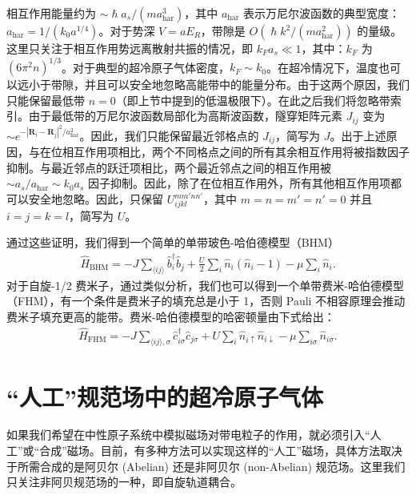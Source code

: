 相互作用能量约为 \(\sim \hslash a_s / (m a_{\text{har}}^3)\)，其中 \(a_{\text{har}}\) 表示万尼尔波函数的典型宽度：\(a_{\text{har}} = 1 / (k_0 a^{1/4})\)。对于势深 \(V = a E_R\)，带隙是 \(O(\hslash k^2 / (m a_{\text{har}}^2))\) 的量级。这里只关注于相互作用势远离散射共振的情况，即 \(k_F a_s \ll 1\)，其中：\(k_F\) 为 \((6\pi^2 n)^{1/3}\)。对于典型的超冷原子气体密度，\(k_F \sim k_0\)。在超冷情况下，温度也可以远小于带隙，并且可以安全地忽略高能带中的能量分布。由于这两个原因，我们只能保留最低带 \(n = 0\)（即上节中提到的低温极限下）。在此之后我们将忽略带索引。由于最低带的万尼尔波函数局部化为高斯波函数，隧穿矩阵元素 \(J_{ij}\) 变为 \(\sim e^{-|\mathbf{R}_i - \mathbf{R}_j|^2 / a_{\text{har}}^2}\)。因此，我们只能保留最近邻格点的 \(J_{ij}\)，简写为 \(J\)。出于上述原因，与在位相互作用项相比，两个不同格点之间的所有其余相互作用将被指数因子抑制。与最近邻点的跃迁项相比，两个最近邻点之间的相互作用被 \(\sim a_s / a_{\text{har}} \sim k_0 a_s\) 因子抑制。因此，除了在位相互作用外，所有其他相互作用项都可以安全地忽略。因此，只保留 \(U_{ijkl}^{mm'nn'}\)，其中 \(m = n = m' = n' = 0\) 并且 \(i = j = k = l\)，简写为 \(U\)。

通过这些证明，我们得到一个简单的单带玻色-哈伯德模型（BHM）\cite{zhai2021ultracold}
\begin{align}
\hat{H}_{\text{BHM}} = -J \sum_{\langle ij \rangle} \hat{b}_i^\dagger \hat{b}_j + \frac{U}{2} \sum_i \hat{n}_i (\hat{n}_i - 1) - \mu \sum_i \hat{n}_i.
\end{align}
对于自旋-1/2 费米子，通过类似分析，我们也可以得到一个单带费米-哈伯德模型（FHM），有一个条件是费米子的填充总是小于 1，否则 Pauli 不相容原理会推动费米子填充更高的能带。费米-哈伯德模型的哈密顿量由下式给出：
\begin{align}
\hat{H}_{\text{FHM}} = -J \sum_{\langle ij \rangle, \sigma} \hat{c}_{i\sigma}^\dagger \hat{c}_{j\sigma} + U \sum_i \hat{n}_{i\uparrow} \hat{n}_{i\downarrow} - \mu \sum_{i\sigma} \hat{n}_{i\sigma}.
\end{align}













\section{“人工”规范场中的超冷原子气体}
如果我们希望在中性原子系统中模拟磁场对带电粒子的作用，就必须引入“人工”或“合成”磁场。目前，有多种方法可以实现这样的“人工”磁场，具体方法取决于所需合成的是阿贝尔 (Abelian) 还是非阿贝尔 (non-Abelian) 规范场。这里我们只关注非阿贝规范场的一种，即自旋轨道耦合。

